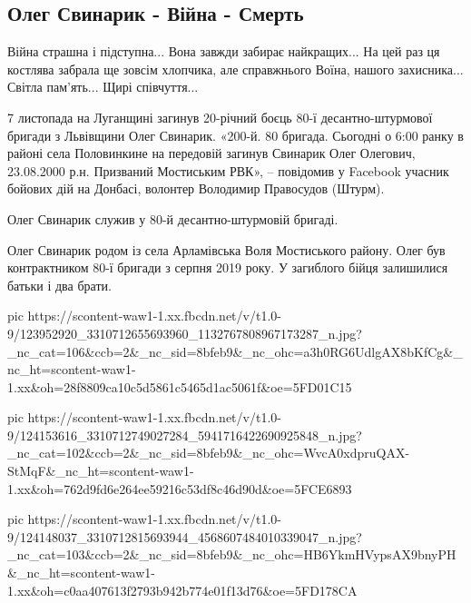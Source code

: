 
 
 

\subsection{Олег Свинарик - Війна - Смерть}

Війна страшна і підступна... Вона завжди забирає найкращих... На цей раз ця
костлява забрала  ще зовсім хлопчика, але справжнього Воїна, нашого
захисника... Світла пам'ять... Щирі співчуття...

7 листопада на Луганщині загинув 20-річний боєць 80-ї десантно-штурмової
бригади з Львівщини Олег Свинарик.  «200-й. 80 бригада. Сьогодні о 6:00 ранку
в районі села Половинкине на передовій загинув Свинарик Олег Олегович,
23.08.2000 р.н. Призваний Мостиським РВК», – повідомив у Facebook учасник
бойових дій на Донбасі, волонтер Володимир Правосудов (Штурм).

Олег Свинарик служив у 80-й десантно-штурмовій бригаді.

Олег Свинарик родом із села Арламівська Воля Мостиського району.  Олег  був
контрактником 80-ї бригади з серпня 2019 року. У загиблого бійця залишилися
батьки і два брати.

\ifcmt
pic https://scontent-waw1-1.xx.fbcdn.net/v/t1.0-9/123952920_3310712655693960_1132767808967173287_n.jpg?_nc_cat=106&ccb=2&_nc_sid=8bfeb9&_nc_ohc=a3h0RG6UdlgAX8bKfCg&_nc_ht=scontent-waw1-1.xx&oh=28f8809ca10c5d5861c5465d1ac5061f&oe=5FD01C15

pic https://scontent-waw1-1.xx.fbcdn.net/v/t1.0-9/124153616_3310712749027284_5941716422690925848_n.jpg?_nc_cat=102&ccb=2&_nc_sid=8bfeb9&_nc_ohc=WvcA0xdpruQAX-StMqF&_nc_ht=scontent-waw1-1.xx&oh=762d9fd6e264ee59216c53df8c46d90d&oe=5FCE6893

pic https://scontent-waw1-1.xx.fbcdn.net/v/t1.0-9/124148037_3310712815693944_4568607484010339047_n.jpg?_nc_cat=103&ccb=2&_nc_sid=8bfeb9&_nc_ohc=HB6YkmHVypsAX9bnyPH&_nc_ht=scontent-waw1-1.xx&oh=c0aa407613f2793b942b774e01f13d76&oe=5FD178CA
\fi
